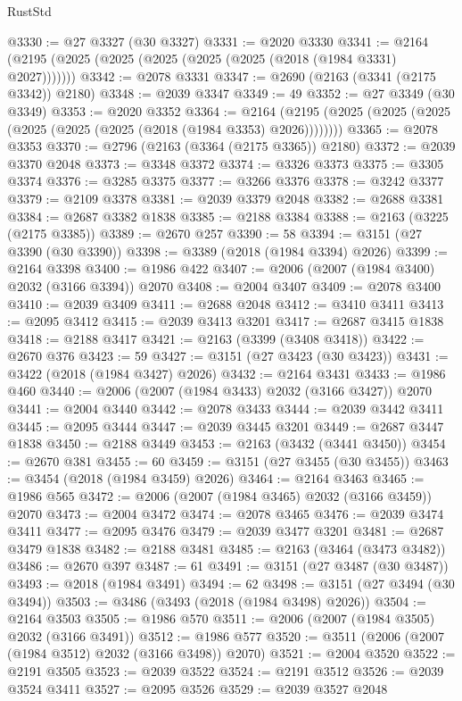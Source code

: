 \begin{lexlean}{RustStd}
\begin{coremodule}
@3330 := @27 @3327 (@30 @3327)
@3331 := @2020 @3330
@3341 := @2164 (@2195 (@2025 (@2025 (@2025 (@2025 (@2025 (@2018 (@1984 @3331) @2027)))))))
@3342 := @2078 @3331
@3347 := @2690 (@2163 (@3341 (@2175 @3342)) @2180)
@3348 := @2039 @3347
@3349 := 49
@3352 := @27 @3349 (@30 @3349)
@3353 := @2020 @3352
@3364 := @2164 (@2195 (@2025 (@2025 (@2025 (@2025 (@2025 (@2025 (@2018 (@1984 @3353) @2026))))))))
@3365 := @2078 @3353
@3370 := @2796 (@2163 (@3364 (@2175 @3365)) @2180)
@3372 := @2039 @3370 @2048
@3373 := @3348 @3372
@3374 := @3326 @3373
@3375 := @3305 @3374
@3376 := @3285 @3375
@3377 := @3266 @3376
@3378 := @3242 @3377
@3379 := @2109 @3378
@3381 := @2039 @3379 @2048
@3382 := @2688 @3381
@3384 := @2687 @3382 @1838
@3385 := @2188 @3384
@3388 := @2163 (@3225 (@2175 @3385))
@3389 := @2670 @257
@3390 := 58
@3394 := @3151 (@27 @3390 (@30 @3390))
@3398 := @3389 (@2018 (@1984 @3394) @2026)
@3399 := @2164 @3398
@3400 := @1986 @422
@3407 := @2006 (@2007 (@1984 @3400) @2032 (@3166 @3394)) @2070
@3408 := @2004 @3407
@3409 := @2078 @3400
@3410 := @2039 @3409
@3411 := @2688 @2048
@3412 := @3410 @3411
@3413 := @2095 @3412
@3415 := @2039 @3413 @3201
@3417 := @2687 @3415 @1838
@3418 := @2188 @3417
@3421 := @2163 (@3399 (@3408 @3418))
@3422 := @2670 @376
@3423 := 59
@3427 := @3151 (@27 @3423 (@30 @3423))
@3431 := @3422 (@2018 (@1984 @3427) @2026)
@3432 := @2164 @3431
@3433 := @1986 @460
@3440 := @2006 (@2007 (@1984 @3433) @2032 (@3166 @3427)) @2070
@3441 := @2004 @3440
@3442 := @2078 @3433
@3444 := @2039 @3442 @3411
@3445 := @2095 @3444
@3447 := @2039 @3445 @3201
@3449 := @2687 @3447 @1838
@3450 := @2188 @3449
@3453 := @2163 (@3432 (@3441 @3450))
@3454 := @2670 @381
@3455 := 60
@3459 := @3151 (@27 @3455 (@30 @3455))
@3463 := @3454 (@2018 (@1984 @3459) @2026)
@3464 := @2164 @3463
@3465 := @1986 @565
@3472 := @2006 (@2007 (@1984 @3465) @2032 (@3166 @3459)) @2070
@3473 := @2004 @3472
@3474 := @2078 @3465
@3476 := @2039 @3474 @3411
@3477 := @2095 @3476
@3479 := @2039 @3477 @3201
@3481 := @2687 @3479 @1838
@3482 := @2188 @3481
@3485 := @2163 (@3464 (@3473 @3482))
@3486 := @2670 @397
@3487 := 61
@3491 := @3151 (@27 @3487 (@30 @3487))
@3493 := @2018 (@1984 @3491)
@3494 := 62
@3498 := @3151 (@27 @3494 (@30 @3494))
@3503 := @3486 (@3493 (@2018 (@1984 @3498) @2026))
@3504 := @2164 @3503
@3505 := @1986 @570
@3511 := @2006 (@2007 (@1984 @3505) @2032 (@3166 @3491))
@3512 := @1986 @577
@3520 := @3511 (@2006 (@2007 (@1984 @3512) @2032 (@3166 @3498)) @2070)
@3521 := @2004 @3520
@3522 := @2191 @3505
@3523 := @2039 @3522
@3524 := @2191 @3512
@3526 := @2039 @3524 @3411
@3527 := @2095 @3526
@3529 := @2039 @3527 @2048

\end{coremodule}
\end{lexlean}
